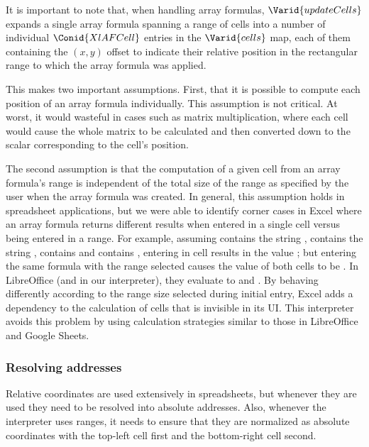 It is important to note that, when handling array formulas, \ensuremath{\Varid{updateCells}}
expands a single array formula spanning a range of cells into a number of
individual \ensuremath{\Conid{XlAFCell}} entries in the \ensuremath{\Varid{cells}} map, each of them containing the
$(x, y)$ offset to indicate their relative position in the rectangular
range to which the array formula was applied. 

This makes two important assumptions. First, that it is possible to compute
each position of an array formula individually. This assumption is not
critical. At worst, it would wasteful in cases such as matrix multiplication,
where each cell would cause the whole matrix to be calculated and then
converted down to the scalar corresponding to the cell's position.

The second assumption is that the computation of a given cell from an array
formula's range is independent of the total size of the range as specified by
the user when the array formula was created. In general, this assumption holds
in spreadsheet applications, but we were able to identify corner cases in
Excel where an array formula returns different results when entered in a
single cell versus being entered in a range. For example, assuming 
contains the string ,  contains the string ,  contains  and
 contains , entering  in cell  results in
the value ; but entering the same formula with the range  selected
causes the value of both cells to be . In LibreOffice (and in our
interpreter), they evaluate to  and . By behaving differently according
to the range size selected during initial entry, Excel adds a dependency to
the calculation of cells that is invisible in its UI. This interpreter avoids
this problem by using calculation strategies similar to those in LibreOffice
and Google Sheets.

\subsubsection{Resolving addresses}

Relative coordinates are used extensively in spreadsheets, but whenever they
are used they need to be resolved into absolute addresses. Also, whenever the
interpreter uses ranges, it needs to ensure that they are normalized as
absolute coordinates with the top-left cell first and the bottom-right cell
second. 

